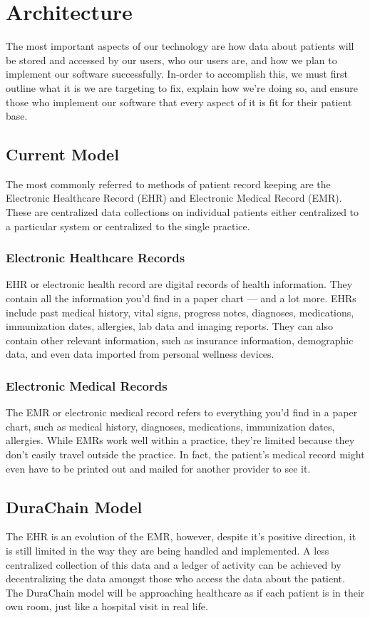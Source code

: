 \documentclass[preprint,pre,floats,aps,amsmath,amssymb]{revtex4-1}
\begin{document}
\section{Architecture}
The most important aspects of our technology are how data about patients will be stored and accessed by our users, who our users are, and how we plan to implement our software successfully. In-order to accomplish this, we must first outline what it is we are targeting to fix, explain how we’re doing so, and ensure those who implement our software that every aspect of it is fit for their patient base.

\subsection{Current Model}
The most commonly referred to methods of patient record keeping are the Electronic Healthcare Record (EHR) and Electronic Medical Record (EMR). These are centralized data collections on individual patients either centralized to a particular system or centralized to the single practice.

  \subsubsection{Electronic Healthcare Records}
  EHR or electronic health record are digital records of health information. They contain all the information you’d find in a paper chart — and a lot more. EHRs include past medical history, vital signs, progress notes, diagnoses, medications, immunization dates, allergies, lab data and imaging reports. They can also contain other relevant information, such as insurance information, demographic data, and even data imported from personal wellness devices.

  \subsubsection{Electronic Medical Records}
  The EMR or electronic medical record refers to everything you’d find in a paper chart, such as medical history, diagnoses, medications, immunization dates, allergies. While EMRs work well within a practice, they’re limited because they don’t easily travel outside the practice. In fact, the patient’s medical record might even have to be printed out and mailed for another provider to see it.

\subsection{DuraChain Model}
The EHR is an evolution of the EMR, however, despite it’s positive direction, it is still limited in the way they are being handled and implemented. A less centralized collection of this data and a ledger of activity can be achieved by decentralizing the data amongst those who access the data about the patient. The DuraChain model will be approaching healthcare as if each patient is in their own room, just like a hospital visit in real life.  
\end{document}
